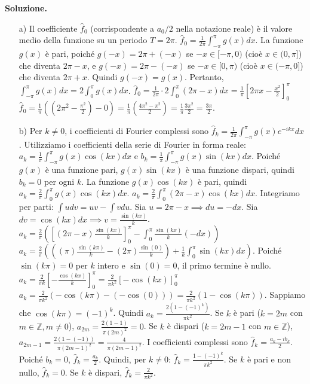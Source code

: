 \documentclass[12pt, a4paper]{article}
\newenvironment{solution}{%
    \par\noindent\textbf{Soluzione.}\medskip\par
    \normalfont
}{\par\bigskip}
\begin{document}
\begin{solution}
\begin{enumerate}
    \item[a)] Il coefficiente $\hat{f}_0$ (corrispondente a $a_0/2$ nella notazione reale) è il valore medio della funzione su un periodo $T=2\pi$.
    $\hat{f}_0 = \frac{1}{2\pi} \int_{-\pi}^{\pi} g(x) dx$.
    La funzione $g(x)$ è pari, poiché $g(-x) = 2\pi + (-x)$ se $-x \in [-\pi, 0)$ (cioè $x \in (0, \pi]$) che diventa $2\pi-x$, e $g(-x) = 2\pi - (-x)$ se $-x \in [0, \pi)$ (cioè $x \in (-\pi, 0]$) che diventa $2\pi+x$. Quindi $g(-x)=g(x)$.
    Pertanto, $\int_{-\pi}^{\pi} g(x) dx = 2 \int_{0}^{\pi} g(x) dx$.
    $\hat{f}_0 = \frac{1}{2\pi} \cdot 2 \int_{0}^{\pi} (2\pi-x) dx = \frac{1}{\pi} \left[ 2\pi x - \frac{x^2}{2} \right]_0^{\pi}$
    $\hat{f}_0 = \frac{1}{\pi} \left( (2\pi^2 - \frac{\pi^2}{2}) - 0 \right) = \frac{1}{\pi} \left( \frac{4\pi^2 - \pi^2}{2} \right) = \frac{1}{\pi} \frac{3\pi^2}{2} = \frac{3\pi}{2}$.

    \item[b)] Per $k \ne 0$, i coefficienti di Fourier complessi sono $\hat{f}_k = \frac{1}{2\pi} \int_{-\pi}^{\pi} g(x) e^{-ikx} dx$.
    Utilizziamo i coefficienti della serie di Fourier in forma reale: $a_k = \frac{1}{\pi} \int_{-\pi}^{\pi} g(x) \cos(kx) dx$ e $b_k = \frac{1}{\pi} \int_{-\pi}^{\pi} g(x) \sin(kx) dx$.
    Poiché $g(x)$ è una funzione pari, $g(x)\sin(kx)$ è una funzione dispari, quindi $b_k = 0$ per ogni $k$.
    La funzione $g(x)\cos(kx)$ è pari, quindi $a_k = \frac{2}{\pi} \int_{0}^{\pi} g(x) \cos(kx) dx$.
    $a_k = \frac{2}{\pi} \int_{0}^{\pi} (2\pi-x) \cos(kx) dx$.
    Integriamo per parti: $\int u dv = uv - \int v du$.
    Sia $u = 2\pi-x \implies du = -dx$.
    Sia $dv = \cos(kx) dx \implies v = \frac{\sin(kx)}{k}$.
    $a_k = \frac{2}{\pi} \left( \left[ (2\pi-x)\frac{\sin(kx)}{k} \right]_0^{\pi} - \int_{0}^{\pi} \frac{\sin(kx)}{k} (-dx) \right)$
    $a_k = \frac{2}{\pi} \left( \left( (\pi)\frac{\sin(k\pi)}{k} - (2\pi)\frac{\sin(0)}{k} \right) + \frac{1}{k} \int_{0}^{\pi} \sin(kx) dx \right)$.
    Poiché $\sin(k\pi)=0$ per $k$ intero e $\sin(0)=0$, il primo termine è nullo.
    $a_k = \frac{2}{\pi k} \left[ -\frac{\cos(kx)}{k} \right]_0^{\pi} = \frac{2}{\pi k^2} [-\cos(kx)]_0^{\pi}$
    $a_k = \frac{2}{\pi k^2} (-\cos(k\pi) - (-\cos(0))) = \frac{2}{\pi k^2} (1 - \cos(k\pi))$.
    Sappiamo che $\cos(k\pi) = (-1)^k$.
    Quindi $a_k = \frac{2(1-(-1)^k)}{\pi k^2}$.
    Se $k$ è pari ($k=2m$ con $m \in \mathbb{Z}, m \ne 0$), $a_{2m} = \frac{2(1-1)}{\pi (2m)^2} = 0$.
    Se $k$ è dispari ($k=2m-1$ con $m \in \mathbb{Z}$), $a_{2m-1} = \frac{2(1-(-1))}{\pi (2m-1)^2} = \frac{4}{\pi (2m-1)^2}$.
    I coefficienti complessi sono $\hat{f}_k = \frac{a_k - i b_k}{2}$. Poiché $b_k=0$, $\hat{f}_k = \frac{a_k}{2}$.
    Quindi, per $k \ne 0$: $\hat{f}_k = \frac{1-(-1)^k}{\pi k^2}$.
    Se $k$ è pari e non nullo, $\hat{f}_k = 0$.
    Se $k$ è dispari, $\hat{f}_k = \frac{2}{\pi k^2}$.


\end{enumerate}
\end{solution}
\end{document}

